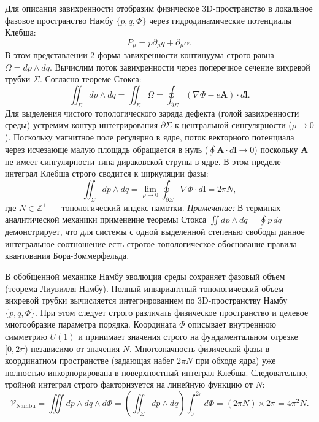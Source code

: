\documentclass[11pt,a4paper]{article}
\begin{document}
Для описания завихренности отобразим физическое 3D-пространство в локальное фазовое пространство Намбу $\{p, q, \Phi\}$ через гидродинамические потенциалы Клебша:
\begin{equation}
	P_\mu = p \partial_\mu q + \partial_\mu \alpha.
\end{equation}
В этом представлении 2-форма завихренности континуума строго равна $\Omega = dp \wedge dq$. 
Вычислим поток завихренности через поперечное сечение вихревой трубки $\Sigma$. Согласно теореме Стокса:
\begin{equation}
	\iint_\Sigma dp \wedge dq = \iint_\Sigma \Omega = \oint_{\partial \Sigma} (\nabla \Phi - e \mathbf{A}) \cdot d\mathbf{l}.
\end{equation}
Для выделения чистого топологического заряда дефекта (голой завихренности среды) устремим контур интегрирования $\partial \Sigma$ к центральной сингулярности ($\rho \to 0$). Поскольку магнитное поле регулярно в ядре, поток векторного потенциала через исчезающе малую площадь обращается в нуль ($\oint \mathbf{A} \cdot d\mathbf{l} \to 0$) поскольку $\mathbf{A}$ не имеет сингулярности типа дираковской струны в ядре. В этом пределе интеграл Клебша строго сводится к циркуляции фазы:
\begin{equation}
	\iint_\Sigma dp \wedge dq = \lim_{\rho \to 0} \oint_{\partial \Sigma} \nabla \Phi \cdot d\mathbf{l} = 2\pi N,
\end{equation}
где $N \in \mathbb{Z}^+$ — топологический индекс намотки.
\textit{Примечание:} В терминах аналитической механики применение теоремы Стокса $\iint dp \wedge dq = \oint p \, dq$ демонстрирует, что для системы с одной выделенной степенью свободы данное интегральное соотношение есть строгое топологическое обоснование правила квантования Бора-Зоммерфельда.

В обобщенной механике Намбу эволюция среды сохраняет фазовый объем (теорема Лиувилля-Намбу). Полный инвариантный топологический объем вихревой трубки вычисляется интегрированием по 3D-пространству Намбу $\{p, q, \Phi\}$. 
При этом следует строго различать физическое пространство и целевое многообразие параметра порядка. Координата $\Phi$ описывает внутреннюю симметрию $U(1)$ и принимает значения строго на фундаментальном отрезке $[0, 2\pi)$ независимо от значения $N$. Многозначность физической фазы в координатном пространстве (задающая набег $2\pi N$ при обходе ядра) уже полностью инкорпорирована в поверхностный интеграл Клебша. Следовательно, тройной интеграл строго факторизуется на линейную функцию от $N$:
\begin{equation}
	\mathcal{V}_{\text{Nambu}} = \iiint dp \wedge dq \wedge d\Phi = \left( \iint_\Sigma dp \wedge dq \right) \int_0^{2\pi} d\Phi = (2\pi N) \times 2\pi = 4\pi^2 N.
\end{equation}
\end{document}
